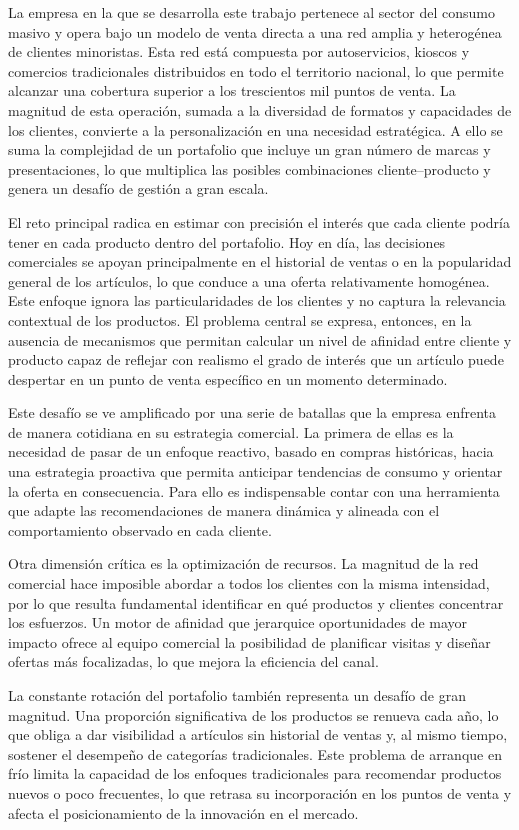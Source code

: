 La empresa en la que se desarrolla este trabajo pertenece al sector del consumo masivo y opera bajo un modelo de venta directa a una red amplia y heterogénea de clientes minoristas. Esta red está compuesta por autoservicios, kioscos y comercios tradicionales distribuidos en todo el territorio nacional, lo que permite alcanzar una cobertura superior a los trescientos mil puntos de venta. La magnitud de esta operación, sumada a la diversidad de formatos y capacidades de los clientes, convierte a la personalización en una necesidad estratégica. A ello se suma la complejidad de un portafolio que incluye un gran número de marcas y presentaciones, lo que multiplica las posibles combinaciones cliente–producto y genera un desafío de gestión a gran escala.

El reto principal radica en estimar con precisión el interés que cada cliente podría tener en cada producto dentro del portafolio. Hoy en día, las decisiones comerciales se apoyan principalmente en el historial de ventas o en la popularidad general de los artículos, lo que conduce a una oferta relativamente homogénea. Este enfoque ignora las particularidades de los clientes y no captura la relevancia contextual de los productos. El problema central se expresa, entonces, en la ausencia de mecanismos que permitan calcular un nivel de afinidad entre cliente y producto capaz de reflejar con realismo el grado de interés que un artículo puede despertar en un punto de venta específico en un momento determinado.

Este desafío se ve amplificado por una serie de batallas que la empresa enfrenta de manera cotidiana en su estrategia comercial. La primera de ellas es la necesidad de pasar de un enfoque reactivo, basado en compras históricas, hacia una estrategia proactiva que permita anticipar tendencias de consumo y orientar la oferta en consecuencia. Para ello es indispensable contar con una herramienta que adapte las recomendaciones de manera dinámica y alineada con el comportamiento observado en cada cliente.

Otra dimensión crítica es la optimización de recursos. La magnitud de la red comercial hace imposible abordar a todos los clientes con la misma intensidad, por lo que resulta fundamental identificar en qué productos y clientes concentrar los esfuerzos. Un motor de afinidad que jerarquice oportunidades de mayor impacto ofrece al equipo comercial la posibilidad de planificar visitas y diseñar ofertas más focalizadas, lo que mejora la eficiencia del canal.

La constante rotación del portafolio también representa un desafío de gran magnitud. Una proporción significativa de los productos se renueva cada año, lo que obliga a dar visibilidad a artículos sin historial de ventas y, al mismo tiempo, sostener el desempeño de categorías tradicionales. Este problema de arranque en frío limita la capacidad de los enfoques tradicionales para recomendar productos nuevos o poco frecuentes, lo que retrasa su incorporación en los puntos de venta y afecta el posicionamiento de la innovación en el mercado.

